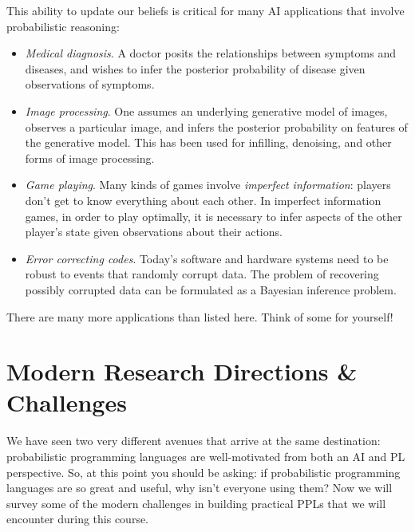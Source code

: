 \documentclass{../tufte-handout}
\begin{document}
This ability to update our beliefs is critical for many AI applications 
that involve probabilistic reasoning:
\begin{itemize}
  \item \emph{Medical diagnosis}. A doctor posits the relationships between symptoms and 
  diseases, and wishes to infer the posterior probability of disease given observations 
  of symptoms.
  \item \emph{Image processing}. One assumes an underlying generative model of images, 
  observes a particular image, and infers the posterior probability on features of the 
  generative model. This has been used for infilling, denoising, and other forms of image processing.
  \item \emph{Game playing}. Many kinds of games involve \emph{imperfect information}: players
  don't get to know everything about each other. In imperfect information games, in order to 
  play optimally, it is necessary to infer aspects of the other player's state given observations 
  about their actions.
  \item \emph{Error correcting codes}. Today's software and hardware systems need to be robust to 
  events that randomly corrupt data. The problem of recovering possibly corrupted data can 
  be formulated as a Bayesian inference problem.
\end{itemize}
There are many more applications than listed here. Think of some for yourself!

\section{Modern Research Directions \& Challenges}
We have seen two very different avenues that arrive at the same destination: 
probabilistic programming languages are well-motivated from both an AI and PL 
perspective.  So, at this point you should be asking: if probabilistic
programming languages are so great and useful, why isn't everyone using them? 
Now we will survey some of the modern challenges in building practical PPLs 
that we will encounter during this course.


\end{document}
